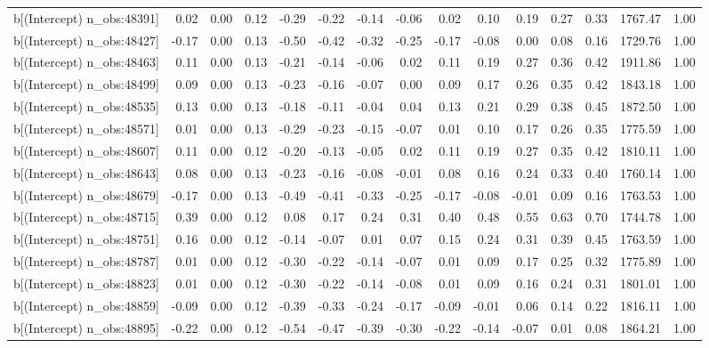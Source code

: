 \begin{table}[ht]
\begin{tabular}{rrrrrrrrrrrrrrr}
  b[(Intercept) n\_obs:48391] & 0.02 & 0.00 & 0.12 & -0.29 & -0.22 & -0.14 & -0.06 & 0.02 & 0.10 & 0.19 & 0.27 & 0.33 & 1767.47 & 1.00 \\ 
  b[(Intercept) n\_obs:48427] & -0.17 & 0.00 & 0.13 & -0.50 & -0.42 & -0.32 & -0.25 & -0.17 & -0.08 & 0.00 & 0.08 & 0.16 & 1729.76 & 1.00 \\ 
  b[(Intercept) n\_obs:48463] & 0.11 & 0.00 & 0.13 & -0.21 & -0.14 & -0.06 & 0.02 & 0.11 & 0.19 & 0.27 & 0.36 & 0.42 & 1911.86 & 1.00 \\ 
  b[(Intercept) n\_obs:48499] & 0.09 & 0.00 & 0.13 & -0.23 & -0.16 & -0.07 & 0.00 & 0.09 & 0.17 & 0.26 & 0.35 & 0.42 & 1843.18 & 1.00 \\ 
  b[(Intercept) n\_obs:48535] & 0.13 & 0.00 & 0.13 & -0.18 & -0.11 & -0.04 & 0.04 & 0.13 & 0.21 & 0.29 & 0.38 & 0.45 & 1872.50 & 1.00 \\ 
  b[(Intercept) n\_obs:48571] & 0.01 & 0.00 & 0.13 & -0.29 & -0.23 & -0.15 & -0.07 & 0.01 & 0.10 & 0.17 & 0.26 & 0.35 & 1775.59 & 1.00 \\ 
  b[(Intercept) n\_obs:48607] & 0.11 & 0.00 & 0.12 & -0.20 & -0.13 & -0.05 & 0.02 & 0.11 & 0.19 & 0.27 & 0.35 & 0.42 & 1810.11 & 1.00 \\ 
  b[(Intercept) n\_obs:48643] & 0.08 & 0.00 & 0.13 & -0.23 & -0.16 & -0.08 & -0.01 & 0.08 & 0.16 & 0.24 & 0.33 & 0.40 & 1760.14 & 1.00 \\ 
  b[(Intercept) n\_obs:48679] & -0.17 & 0.00 & 0.13 & -0.49 & -0.41 & -0.33 & -0.25 & -0.17 & -0.08 & -0.01 & 0.09 & 0.16 & 1763.53 & 1.00 \\ 
  b[(Intercept) n\_obs:48715] & 0.39 & 0.00 & 0.12 & 0.08 & 0.17 & 0.24 & 0.31 & 0.40 & 0.48 & 0.55 & 0.63 & 0.70 & 1744.78 & 1.00 \\ 
  b[(Intercept) n\_obs:48751] & 0.16 & 0.00 & 0.12 & -0.14 & -0.07 & 0.01 & 0.07 & 0.15 & 0.24 & 0.31 & 0.39 & 0.45 & 1763.59 & 1.00 \\ 
  b[(Intercept) n\_obs:48787] & 0.01 & 0.00 & 0.12 & -0.30 & -0.22 & -0.14 & -0.07 & 0.01 & 0.09 & 0.17 & 0.25 & 0.32 & 1775.89 & 1.00 \\ 
  b[(Intercept) n\_obs:48823] & 0.01 & 0.00 & 0.12 & -0.30 & -0.22 & -0.14 & -0.08 & 0.01 & 0.09 & 0.16 & 0.24 & 0.31 & 1801.01 & 1.00 \\ 
  b[(Intercept) n\_obs:48859] & -0.09 & 0.00 & 0.12 & -0.39 & -0.33 & -0.24 & -0.17 & -0.09 & -0.01 & 0.06 & 0.14 & 0.22 & 1816.11 & 1.00 \\ 
  b[(Intercept) n\_obs:48895] & -0.22 & 0.00 & 0.12 & -0.54 & -0.47 & -0.39 & -0.30 & -0.22 & -0.14 & -0.07 & 0.01 & 0.08 & 1864.21 & 1.00 \\ 

\end{tabular}
\end{table}

